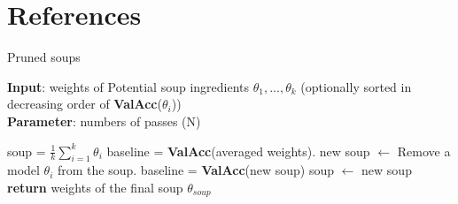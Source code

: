 \documentclass[10pt,twocolumn,letterpaper]{article}
\begin{document}
\section{References}

\begin{algorithm}[tb]
\caption{Pruned soups}
\label{alg:algorithm}
\textbf{Input}: weights of Potential soup ingredients ${\theta_1, ..., \theta_k}$ (optionally sorted in decreasing order of \textbf{ValAcc}($\theta_i$))\\
\textbf{Parameter}: numbers of passes (N)\\
\begin{algorithmic}[1] %
\STATE soup = $\frac{1}{k} \sum_{i=1}^k \theta_i$
\STATE baseline = \textbf{ValAcc}(averaged weights).
\STATE new soup $\leftarrow$ Remove a model $\theta_i$ from the soup.
\STATE baseline = \textbf{ValAcc}(new soup)
\STATE soup $\leftarrow$ new soup
\ENDIF
\ENDFOR
\ENDFOR
\STATE \textbf{return} weights of the final soup $\theta_{soup}$
\end{algorithmic}
\end{algorithm}


\end{document}
